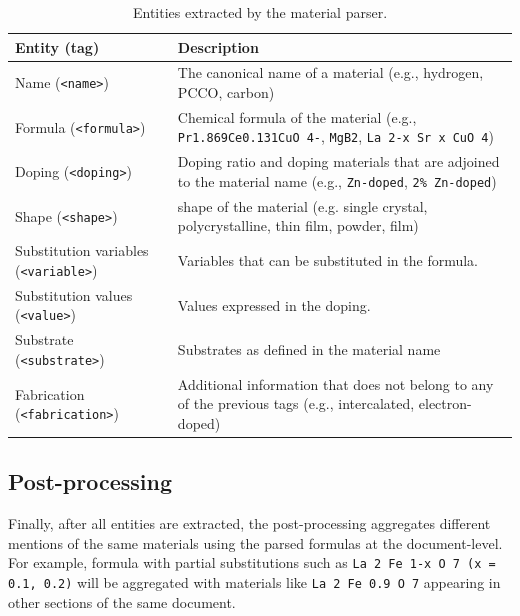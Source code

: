 \begin{table}[ht]
    \centering\small
    \caption{Entities extracted by the material parser. }

    \begin{tabular}{m{10em} m{20em}}
        \toprule
        \textbf{Entity} (\textbf{tag})               & \textbf{Description}                                                                                                              \\
        \midrule
        Name (\texttt{<name>})                       & The canonical name of a material (e.g., hydrogen, PCCO, carbon)                                                                    \\
        Formula (\texttt{<formula>})                 & Chemical formula of the material (e.g., \texttt{Pr1.869Ce0.131CuO 4-}, \texttt{MgB2}, \texttt{La 2-x Sr x CuO 4})                  \\
        Doping (\texttt{<doping>})                   & Doping ratio and doping materials that are adjoined to the material name (e.g., \texttt{Zn-doped}, \texttt{2\% Zn-doped})          \\
        Shape (\texttt{<shape>})                     & shape of the material (e.g. single crystal, polycrystalline, thin film, powder, film)                                             \\
        Substitution variables (\texttt{<variable>}) & Variables that can be substituted in the formula.                                                                                 \\
        Substitution values (\texttt{<value>})       & Values expressed in the doping.                                                                                                   \\
        Substrate (\texttt{<substrate>})             & Substrates as defined in the material name                                                                                        \\
        Fabrication (\texttt{<fabrication>})         & Additional information that does not belong to any of the previous tags  (e.g., intercalated, electron-doped) \\
        \bottomrule
    \end{tabular}
    
    \label{tab:material-parser-entities}
\end{table}


\subsection{Post-processing}
Finally, after all entities are extracted, the post-processing aggregates different mentions of the same materials using the parsed formulas at the document-level.
For example, formula with partial substitutions such as \texttt{La 2 Fe 1-x O 7 (x = 0.1, 0.2)} will be aggregated with materials like \texttt{La 2 Fe 0.9 O 7} appearing in other sections of the same document.


